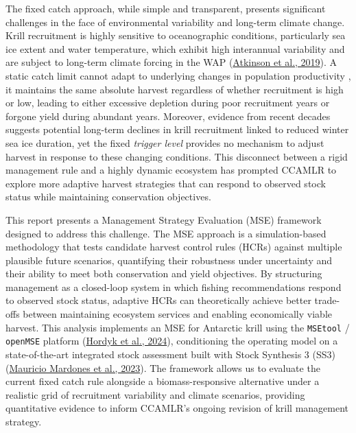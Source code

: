 \documentclass[
]{article}
\begin{document}
The fixed catch approach, while simple and transparent, presents significant challenges in the face of environmental variability and long-term climate change. Krill recruitment is highly sensitive to oceanographic conditions, particularly sea ice extent and water temperature, which exhibit high interannual variability and are subject to long-term climate forcing in the WAP (\protect\hyperlink{ref-Atkinson2019a}{Atkinson et al., 2019}). A static catch limit cannot adapt to underlying changes in population productivity , it maintains the same absolute harvest regardless of whether recruitment is high or low, leading to either excessive depletion during poor recruitment years or forgone yield during abundant years. Moreover, evidence from recent decades suggests potential long-term declines in krill recruitment linked to reduced winter sea ice duration, yet the fixed \emph{trigger level} provides no mechanism to adjust harvest in response to these changing conditions. This disconnect between a rigid management rule and a highly dynamic ecosystem has prompted CCAMLR to explore more adaptive harvest strategies that can respond to observed stock status while maintaining conservation objectives.

This report presents a Management Strategy Evaluation (MSE) framework designed to address this challenge. The MSE approach is a simulation-based methodology that tests candidate harvest control rules (HCRs) against multiple plausible future scenarios, quantifying their robustness under uncertainty and their ability to meet both conservation and yield objectives. By structuring management as a closed-loop system in which fishing recommendations respond to observed stock status, adaptive HCRs can theoretically achieve better trade-offs between maintaining ecosystem services and enabling economically viable harvest. This analysis implements an MSE for Antarctic krill using the \texttt{MSEtool} / \texttt{openMSE} platform (\protect\hyperlink{ref-openMSE}{Hordyk et al., 2024}), conditioning the operating model on a state-of-the-art integrated stock assessment built with Stock Synthesis 3 (SS3) (\protect\hyperlink{ref-Mardones2023}{Mauricio Mardones et al., 2023}). The framework allows us to evaluate the current fixed catch rule alongside a biomass-responsive alternative under a realistic grid of recruitment variability and climate scenarios, providing quantitative evidence to inform CCAMLR's ongoing revision of krill management strategy.
\end{document}
